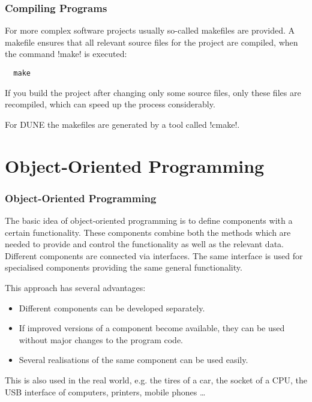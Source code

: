 \begin{frame}[fragile]
  \frametitle<presentation>{Compiling Programs}
  For more complex software projects usually so-called makefiles are provided. A makefile ensures that all relevant source files for the project are compiled, when the command \inline!make! is executed:
  \begin{lstlisting}
  make
  \end{lstlisting}
  If you build the project after changing only some source files, only these files are recompiled, which can speed up the process considerably.
  
  For DUNE the makefiles are generated by a tool called \inline!cmake!.
\end{frame}

\section{Object-Oriented Programming}

\begin{frame}
\frametitle<presentation>{Object-Oriented Programming}
The basic idea of object-oriented programming is to define components with a certain functionality. These components combine both the methods which are needed to provide and control the functionality as well as the relevant data. Different components are connected via interfaces. The same interface is used for specialised components providing the same general functionality.

This approach has several advantages:
\begin{itemize}
\item Different components can be developed separately.
\item If improved versions of a component become available, they can be used without major changes to the program code.
\item Several realisations of the same component can be used easily.
\end{itemize}

This is also used in the real world, e.g. the tires of a car, the socket of a CPU, the USB interface of computers, printers, mobile phones \dots
\end{frame}

